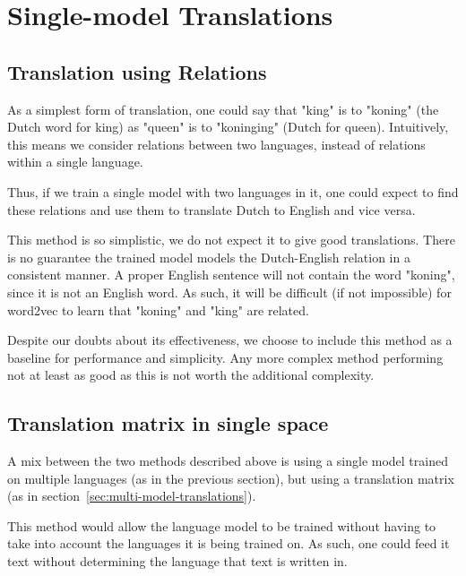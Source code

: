 \section{Single-model Translations}
\label{sec:single-model-translations}

\subsection{Translation using Relations}
As a simplest form of translation, one could say that "king" is to "koning" (the Dutch word for king) as "queen" is to "koninging" (Dutch for queen). Intuitively, this means we consider relations between two languages, instead of relations within a single language.

Thus, if we train a single model with two languages in it, one could expect to find these relations and use them to translate Dutch to English and vice versa.

This method is so simplistic, we do not expect it to give good translations. There is no guarantee the trained model models the Dutch-English relation in a consistent manner. A proper English sentence will not contain the word "koning", since it is not an English word. As such, it will be difficult (if not impossible) for word2vec to learn that "koning" and "king" are related.

Despite our doubts about its effectiveness, we choose to include this method as a baseline for performance and simplicity. Any more complex method performing not at least as good as this is not worth the additional complexity.

\subsection{Translation matrix in single space}
A mix between the two methods described above is using a single model trained on multiple languages (as in the previous section), but using a translation matrix (as in section~\ref{sec:multi-model-translations}).

This method would allow the language model to be trained without having to take into account the languages it is being trained on. As such, one could feed it text without determining the language that text is written in.

